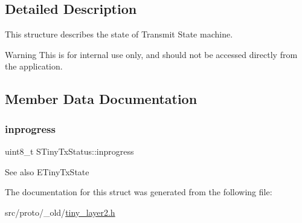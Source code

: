 \subsection{Detailed Description}
This structure describes the state of Transmit State machine. \begin{DoxyWarning}{Warning}
This is for internal use only, and should not be accessed directly from the application. 
\end{DoxyWarning}


\subsection{Member Data Documentation}
\mbox{\label{structSTinyTxStatus_a8d7fa9861ba2adb1fd4ad4689548d238}} 
\subsubsection{\texorpdfstring{inprogress}{inprogress}}
{\footnotesize\ttfamily uint8\+\_\+t S\+Tiny\+Tx\+Status\+::inprogress}

\begin{DoxySeeAlso}{See also}
E\+Tiny\+Tx\+State 
\end{DoxySeeAlso}


The documentation for this struct was generated from the following file\+:\begin{DoxyCompactItemize}
\item 
src/proto/\+\_\+old/\hyperlink{tiny__layer2_8h}{tiny\+\_\+layer2.\+h}\end{DoxyCompactItemize}
